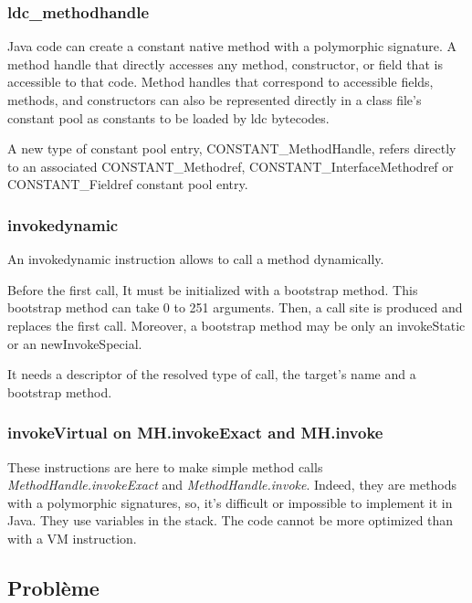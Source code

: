 \documentclass{sigplanconf}
\begin{document}
      \subsubsection{ldc\_methodhandle}
        Java code can create a constant native method with a polymorphic signature.
        A method handle that directly accesses any
        method, constructor, or field that is accessible to that code.
        Method handles that correspond to accessible fields, methods, and constructors
        can also be represented directly in a class file's constant pool
        as constants to be loaded by ldc bytecodes.

        A new type of constant pool entry, CONSTANT\_MethodHandle,
        refers directly to an associated CONSTANT\_Methodref,
        CONSTANT\_InterfaceMethodref or CONSTANT\_Fieldref constant pool entry.

      \subsubsection{invokedynamic}
        An invokedynamic instruction allows to call a method dynamically.

        Before the first call, It must be initialized with a bootstrap method.
        This bootstrap method can take 0 to 251 arguments.
        Then, a call site is produced and replaces the first call.
        Moreover, a bootstrap method may be only an invokeStatic or an newInvokeSpecial.

        It needs a descriptor of the resolved type of call, the target's name and a bootstrap method.

      \subsubsection{invokeVirtual on MH.invokeExact and MH.invoke}
        These instructions are here to make simple method calls\\
        \mbox{\textit{MethodHandle.invokeExact}} and \mbox{\textit{MethodHandle.invoke}}.
        Indeed, they are methods with a polymorphic signatures,
        so, it's difficult or impossible to implement it in Java.
        They use variables in the stack.
        The code cannot be more optimized than with a VM instruction.

  \subsection{Probl\`eme}
\end{document}

